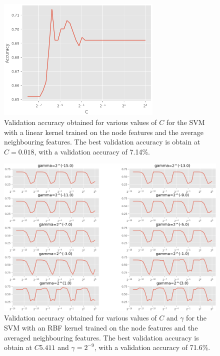 \documentclass[12pt]{article}
\theoremstyle{definition}
\begin{document}
\begin{figure}[h]
	\includegraphics[width=0.7\textwidth]{average_svm/linear_reg}
	\centering
	\caption{Validation accuracy obtained for various values of $C$ for the SVM with a linear kernel trained on the node features and the average neighbouring features. The best validation accuracy is obtain at $C=0.018$, with a validation accuracy of 7.14\%.}
	\label{fig/average_svm_linear_reg}
\end{figure}
\begin{figure}[h]
	\includegraphics[width=1.0\textwidth]{average_svm/rbf_reg}
	\centering
	\caption{Validation accuracy obtained for various values of $C$ and $\gamma$ for the SVM with an RBF kernel trained on the node features and the averaged neighbouring features. The best validation accuracy is obtain at $C5.411$ and $\gamma=2^{-9}$, with a validation accuracy of 71.6\%.}
	\label{fig/average_svm_rbf_reg}
\end{figure}

\bigskip
\end{document}
